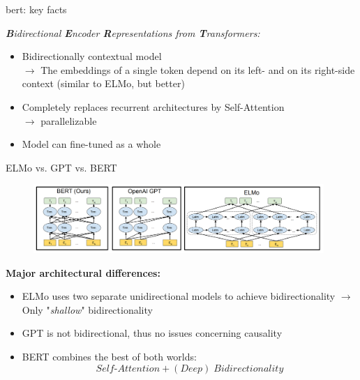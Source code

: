 \begin{vbframe}{bert: key facts}

\vfill

\textit{\textbf{B}idirectional \textbf{E}ncoder \textbf{R}epresentations from \textbf{T}ransformers:}

\vspace{.5cm}

\begin{itemize}
		\item Bidirectionally contextual model\\
					$\to$ The embeddings of a single token depend on its left- and on its right-side context (similar to ELMo, but better)
		\item Completely replaces recurrent architectures by Self-Attention\\
					$\to$ parallelizable
		\item Model can fine-tuned as a whole
\end{itemize}

\vfill

\end{vbframe}


\begin{vbframe}{ELMo vs. GPT vs. BERT}

\vfill

\begin{figure}
\centering
\includegraphics[width = 11cm]{figure/comparison-bert.png}\\ 
\end{figure}

\textbf{Major architectural differences:}

\begin{itemize}
\item ELMo uses two separate unidirectional models to achieve bidirectionality 
  $\rightarrow$ Only "\textit{shallow}" bidirectionality
\item GPT is not bidirectional, thus no issues concerning causality
\item BERT combines the best of both worlds: $$Self\text{-}Attention + (Deep)\;Bidirectionality$$
\end{itemize} 

\vfill

\end{vbframe}

